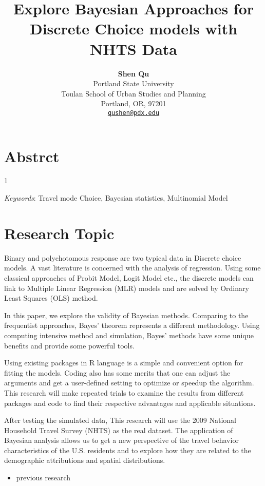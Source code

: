 \documentclass[numbered]{trbunofficial}
\title{Explore Bayesian Approaches for Discrete Choice models with NHTS Data}
\author{
      \textbf{Shen Qu} \\
    {Portland State University} \\
    {Toulan School of Urban Studies and Planning} \\  {Portland, OR, 97201} \\  
    {\href{mailto:qushen@pdx.edu}{\nolinkurl{qushen@pdx.edu}}} \\
    \hfill\break%
  }
\providecommand{\tightlist}{%
  \setlength{\itemsep}{0pt}\setlength{\parskip}{0pt}}
\begin{document}
\nolinenumbers
\maketitle

\linenumbers

\section{Abstrct}
1
\hfill\break

  \noindent\textit{Keywords}: Travel mode Choice, Bayesian statistics, Multinomial Model

\newpage

\hypertarget{research-topic}{%
\section{Research Topic}\label{research-topic}}

Binary and polychotomous response are two typical data in Discrete choice models. A vast literature is concerned with the analysis of regression. Using some classical approaches of Probit Model, Logit Model etc., the discrete models can link to Multiple Linear Regression (MLR) models and are solved by Ordinary Least Squares (OLS) method.

In this paper, we explore the validity of Bayesian methods. Comparing to the frequentist approaches, Bayes' theorem represents a different methodology. Using computing intensive method and simulation, Bayes' methods have some unique benefits and provide some powerful tools.

Using existing packages in R language is a simple and convenient option for fitting the models. Coding also has some merits that one can adjust the arguments and get a user-defined setting to optimize or speedup the algorithm. This research will make repeated trials to examine the results from different packages and code to find their respective advantages and applicable situations.

After testing the simulated data, This research will use the 2009 National Household Travel Survey (NHTS) as the real dataset. The application of Bayesian analysis allows us to get a new perspective of the travel behavior characteristics of the U.S. residents and to explore how they are related to the demographic attributions and spatial distributions.

\begin{itemize}
\tightlist
\item
  previous research
\end{itemize}
\end{document}
